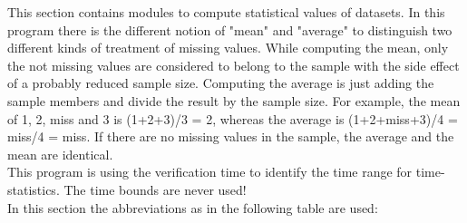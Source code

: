 This section contains modules to compute statistical values of datasets.
In this program there is the different notion of "mean" and "average"
to distinguish two different kinds of treatment of missing values.
While computing the mean, only the not missing values are considered
to belong to the sample with the side effect of a probably reduced sample
size. Computing the average is just adding the sample members and divide
the result by the sample size. For example, the mean of 1, 2, miss and 3
is (1+2+3)/3 = 2, whereas the average is (1+2+miss+3)/4 = miss/4 = miss.
If there are no missing values in the sample, the average and the mean are identical.\\
This program is using the verification time to identify the time range
for time-statistics. The time bounds are never used! \\

In this section the abbreviations as in the following table are used:

\vspace{3mm}

